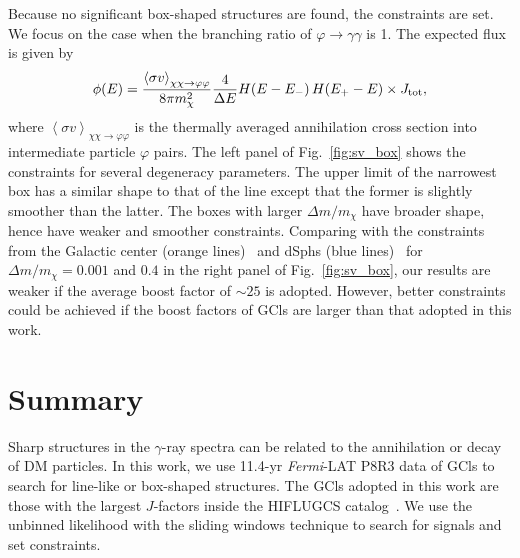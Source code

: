 \documentclass[
	twocolumn,
]{aastex6} %
\newcommand{\lat}{\emph{Fermi}-LAT\xspace}
\newcommand{\gr}{$\gamma$-ray\xspace}
\begin{document}
Because no significant box-shaped structures are found, the constraints are set.
We focus on the case when the branching ratio of $\varphi \to \gamma\gamma$ is 1.
The expected flux is given by~\citep{Ibarra2012}
\begin{equation}
	\phi(E) = \frac{\left< \sigma v \right>_{\chi\chi \to \varphi\varphi}}{8\pi m_\chi^2} \frac{4}{\Delta E} H(E - E_-)\,H(E_+ - E)\times J_{\rm tot},
\end{equation}
where $\left< \sigma v \right>_{\chi\chi \to \varphi\varphi}$ is the thermally averaged annihilation cross section into intermediate particle $\varphi$ pairs.
The left panel of Fig.~\ref{fig:sv_box} shows the constraints for several degeneracy parameters.
The upper limit of the narrowest box has a similar shape to that of the line except that the former is slightly smoother than the latter.
The boxes with larger $\Delta m/m_\chi$ have broader shape, hence have weaker and smoother constraints.
Comparing with the constraints from the Galactic center (orange lines)~\citep{Ibarra2012} and dSphs (blue lines)~\citep{LiS2018} for $\Delta m/m_\chi=0.001$ and $0.4$ in the right panel of Fig.~\ref{fig:sv_box}, our results are weaker if the average boost factor of $\sim 25$ is adopted.
However, better constraints could be achieved if the boost factors of GCls are larger than that adopted in this work.

\section{Summary}\label{sec::summary}
Sharp structures in the \gr spectra can be related to the annihilation or decay of DM particles.
In this work, we use 11.4-yr \lat P8R3 data of GCls to search for line-like or box-shaped structures.
The GCls adopted in this work are those with the largest $J$-factors inside the HIFLUGCS catalog~\citep{Reiprich2002,Chen2007,Anderson2016}.
We use the unbinned likelihood with the sliding windows technique to search for signals and set constraints.
\end{document}
